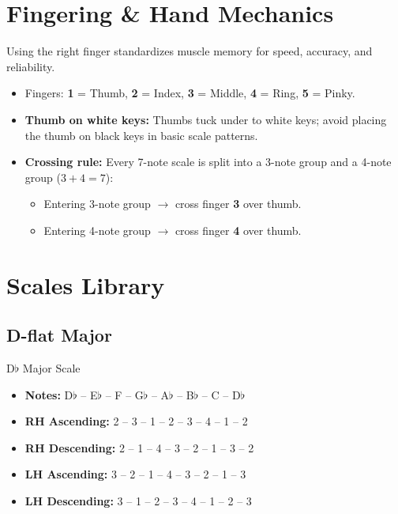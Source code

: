 \section{Fingering \& Hand Mechanics}

Using the right finger standardizes muscle memory for speed, accuracy, and reliability.
\begin{itemize}
    \item Fingers: \textbf{1} = Thumb, \textbf{2} = Index, \textbf{3} = Middle, \textbf{4} = Ring, \textbf{5} = Pinky.
    \item \textbf{Thumb on white keys:} Thumbs tuck under to white keys; avoid placing the thumb on black keys in basic scale patterns.
    \item \textbf{Crossing rule:} Every 7-note scale is split into a 3-note group and a 4-note group ($3 + 4 = 7$):
    \begin{itemize}
        \item Entering 3-note group $\rightarrow$ cross finger \textbf{3} over thumb.
        \item Entering 4-note group $\rightarrow$ cross finger \textbf{4} over thumb.
    \end{itemize}
\end{itemize}

\section{Scales Library}

\subsection{D-flat Major}
\begin{definitionbox}{D$\flat$ Major Scale}
\begin{itemize}
    \item \textbf{Notes:} D$\flat$ -- E$\flat$ -- F -- G$\flat$ -- A$\flat$ -- B$\flat$ -- C -- D$\flat$
    \item \textbf{RH Ascending:} 2 -- 3 -- 1 -- 2 -- 3 -- 4 -- 1 -- 2
    \item \textbf{RH Descending:} 2 -- 1 -- 4 -- 3 -- 2 -- 1 -- 3 -- 2
    \item \textbf{LH Ascending:} 3 -- 2 -- 1 -- 4 -- 3 -- 2 -- 1 -- 3
    \item \textbf{LH Descending:} 3 -- 1 -- 2 -- 3 -- 4 -- 1 -- 2 -- 3
\end{itemize}
\end{definitionbox}

